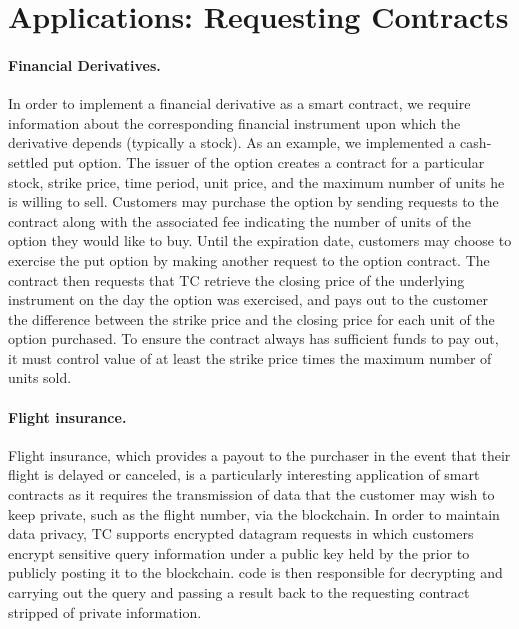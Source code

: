 \section{Applications: Requesting Contracts}

\paragraph{Financial Derivatives.}  In order to implement a financial derivative as a smart contract, we require information about the corresponding financial instrument upon which the derivative depends (typically a stock).  As an example, we implemented a cash-settled put option.  The issuer of the option creates a contract for a particular stock, strike price, time period, unit price, and the maximum number of units he is willing to sell.  Customers may purchase the option by sending requests to the contract along with the associated fee indicating the number of units of the option they would like to buy.  Until the expiration date, customers may choose to exercise the put option by making another request to the option contract.  The contract then requests that TC retrieve the closing price of the underlying instrument on the day the option was exercised, and pays out to the customer the difference between the strike price and the closing price for each unit of the option purchased.  To ensure the contract always has sufficient funds to pay out, it must control value of at least the strike price times the maximum number of units sold.

\paragraph{Flight insurance.} Flight insurance, which provides a payout to the purchaser in the event that their flight is delayed or canceled, is a particularly interesting application of smart contracts as it requires  the transmission of data that the customer may wish to keep private, such as the flight number, via the blockchain.  In order to maintain data privacy, TC supports encrypted datagram requests in which customers encrypt sensitive query information under a public key held by the \encname prior to publicly posting it to the blockchain.  \encname code is then responsible for decrypting and carrying out the query and passing a result back to the requesting contract stripped of private information.  

